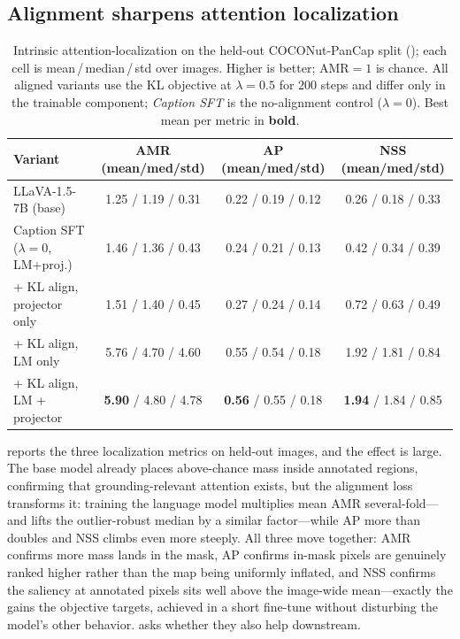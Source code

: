 \subsection{Alignment sharpens attention localization}
\label{sec:results-quant}

\begin{table}[t]
\centering
\caption{Intrinsic attention-localization on the held-out COCONut-PanCap split (); each cell is mean\,/\,median\,/\,std over images. Higher is better; $\mathrm{AMR}=1$ is chance. All aligned variants use the KL objective at $\lambda=0.5$ for $200$ steps and differ only in the trainable component; \emph{Caption SFT} is the no-alignment control ($\lambda=0$). Best mean per metric in \textbf{bold}.}
\label{tab:align}
\vskip 0.1in
\small
\begin{tabular}{lccc}
\toprule
Variant & AMR (mean/med/std) & AP (mean/med/std) & NSS (mean/med/std) \\
\midrule
LLaVA-1.5-7B (base)              & 1.25 / 1.19 / 0.31 & 0.22 / 0.19 / 0.12 & 0.26 / 0.18 / 0.33 \\
Caption SFT ($\lambda{=}0$, LM+proj.) & 1.46 / 1.36 / 0.43 & 0.24 / 0.21 / 0.13 & 0.42 / 0.34 / 0.39 \\
+ KL align, projector only       & 1.51 / 1.40 / 0.45 & 0.27 / 0.24 / 0.14 & 0.72 / 0.63 / 0.49 \\
+ KL align, LM only              & 5.76 / 4.70 / 4.60 & 0.55 / 0.54 / 0.18 & 1.92 / 1.81 / 0.84 \\
+ KL align, LM + projector       & \textbf{5.90} / 4.80 / 4.78 & \textbf{0.56} / 0.55 / 0.18 & \textbf{1.94} / 1.84 / 0.85 \\
\bottomrule
\end{tabular}
\end{table}

 reports the three localization metrics on held-out images, and the effect is large. The base model already places above-chance mass inside annotated regions, confirming that grounding-relevant attention exists, but the alignment loss transforms it: training the language model multiplies mean AMR several-fold---and lifts the outlier-robust median by a similar factor---while AP more than doubles and NSS climbs even more steeply. All three move together: AMR confirms more mass lands in the mask, AP confirms in-mask pixels are genuinely ranked higher rather than the map being uniformly inflated, and NSS confirms the saliency at annotated pixels sits well above the image-wide mean---exactly the gains the objective targets, achieved in a short fine-tune without disturbing the model's other behavior.  asks whether they also help downstream.

